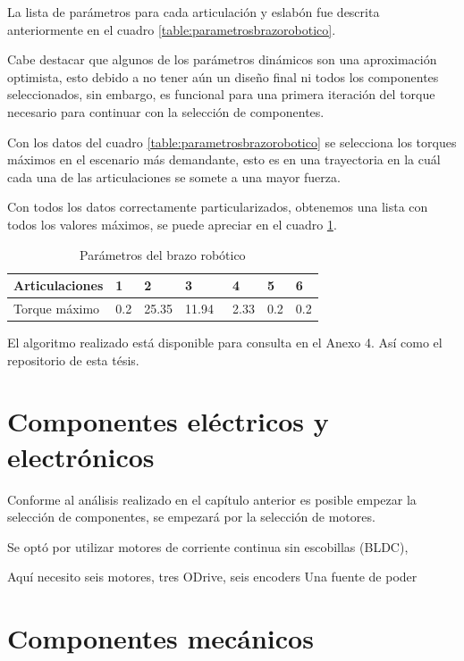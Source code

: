 La lista de parámetros para cada articulación y eslabón fue descrita anteriormente en el cuadro \ref{table:parametrosbrazorobotico}.

Cabe destacar que algunos de los parámetros dinámicos son una aproximación optimista, esto debido a no tener aún un diseño final ni todos los componentes seleccionados, sin embargo, es funcional para una primera iteración del torque necesario para continuar con la selección de componentes.

Con los datos del cuadro \ref{table:parametrosbrazorobotico} se selecciona los torques máximos en el escenario más demandante, esto es en una trayectoria en la cuál cada una de las articulaciones se somete a una mayor fuerza.

Con todos los datos correctamente particularizados, obtenemos una lista con todos los valores máximos, se puede apreciar en el cuadro \ref{table:maxtorque}. 

\begin{table}
\centering
\caption{Parámetros del brazo robótico}
\label{table:maxtorque}
\begin{tabular}{l|l|l|l|l|l|l|}
\textbf{Articulaciones}              &  1 & 2 & 3 &  4 &  5 &  6  \\ 
\hline
Torque máximo & 0.2            & 25.35          & 11.94~         & 2.33           & 0.2            & 0.2            
\end{tabular}
\end{table}

El algoritmo realizado está disponible para consulta en el Anexo 4. Así como el repositorio de esta tésis.
       
\section{Componentes eléctricos y electrónicos}

Conforme al análisis realizado en el capítulo anterior es posible empezar la selección de componentes, se empezará por la selección de motores.

Se optó por utilizar motores de corriente continua sin escobillas (BLDC), 





Aquí necesito seis motores, tres ODrive, seis encoders
Una fuente de poder 

\section{Componentes mecánicos}


